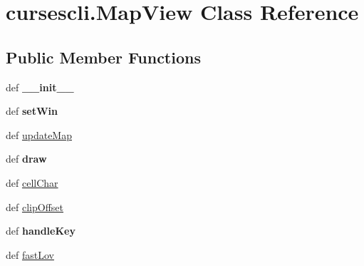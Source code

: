 \hypertarget{classcursescli_1_1_map_view}{\section{cursescli.\-Map\-View \-Class \-Reference}
\label{classcursescli_1_1_map_view}
}
\subsection*{\-Public \-Member \-Functions}
\begin{DoxyCompactItemize}
\item 
\hypertarget{classcursescli_1_1_map_view_a2e7192c9bcef7b62b2f34ecea5101280}{def {\bfseries \-\_\-\-\_\-init\-\_\-\-\_\-}}\label{classcursescli_1_1_map_view_a2e7192c9bcef7b62b2f34ecea5101280}

\item 
\hypertarget{classcursescli_1_1_map_view_a98293a3fb6b4650944eac5ea1f6e25f8}{def {\bfseries set\-Win}}\label{classcursescli_1_1_map_view_a98293a3fb6b4650944eac5ea1f6e25f8}

\item 
def \hyperlink{classcursescli_1_1_map_view_a164da5d021ea0cc4ce801b317a0ad81a}{update\-Map}
\item 
\hypertarget{classcursescli_1_1_map_view_a9d57403913f7508f45caf41b09392d8b}{def {\bfseries draw}}\label{classcursescli_1_1_map_view_a9d57403913f7508f45caf41b09392d8b}

\item 
def \hyperlink{classcursescli_1_1_map_view_a5e975a9c8e57ff861e2004aa7bf14ebd}{cell\-Char}
\item 
def \hyperlink{classcursescli_1_1_map_view_a2105c3fd76ffe17112da29240c03b3d4}{clip\-Offset}
\item 
\hypertarget{classcursescli_1_1_map_view_afa7ab3d700a7137f1e77cb2165e9d002}{def {\bfseries handle\-Key}}\label{classcursescli_1_1_map_view_afa7ab3d700a7137f1e77cb2165e9d002}

\item 
def \hyperlink{classcursescli_1_1_map_view_a3f342d8c113cbb55a21f4582e5f52fb9}{fast\-Lov}
\end{DoxyCompactItemize}
